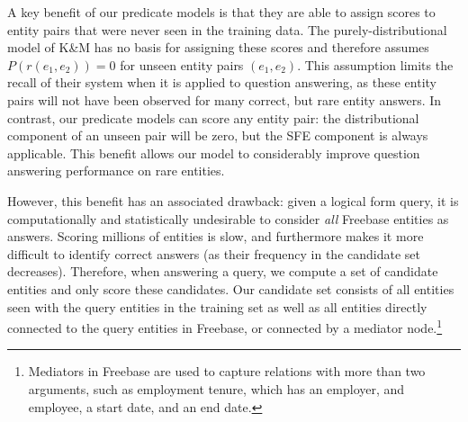 \documentclass[11pt]{article}
\newcommand{\lexicalpredicate}[1]{\ensuremath{\textit{#1}}}
\newcommand{\entity}[1]{\ensuremath{\textsc{#1}}}
\begin{document}
A key benefit of our predicate models is that they are able to assign
scores to entity pairs that were never seen in the training data. The
purely-distributional model of K\&M has no basis for assigning these
scores and therefore assumes $P(r(e_1,e_2)) = 0$ for unseen entity
pairs $(e_1,e_2)$. This assumption limits the recall of their system
when it is applied to question answering, as these entity pairs will
not have been observed for many correct, but rare entity answers. In
contrast, our predicate models can score any entity pair: the
distributional component of an unseen pair will be zero, but the SFE
component is always applicable. This benefit allows our model to
considerably improve question answering performance on rare entities.

% 

However, this benefit has an associated drawback: given a logical form
query, it is computationally and statistically undesirable to consider
\emph{all} Freebase entities as answers. Scoring millions of entities
is slow, and furthermore makes it more difficult to identify correct
answers (as their frequency in the candidate set
decreases). Therefore, when answering a query, we compute a set of
candidate entities and only score these candidates. Our candidate set
consists of all entities seen with the query entities in the training
set as well as all entities directly connected to the query entities
in Freebase, or connected by a mediator node.\footnote{Mediators in
  Freebase are used to capture relations with more than two arguments,
  such as employment tenure, which has an employer, and employee, a
  start date, and an end date.}
\end{document}
